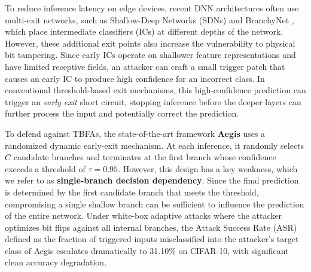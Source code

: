 \documentclass[conference,10pt]{IEEEtran}
\begin{document}

To reduce inference latency on edge devices, recent DNN architectures often use multi-exit networks, such as Shallow-Deep Networks (SDNs) \cite{kaya2019sdn} and BranchyNet \cite{teerapittayanon2016branchynet}, which place intermediate classifiers (ICs) at different depths of the network. However, these additional exit points also increase the vulnerability to physical bit tampering. Since early ICs operate on shallower feature representations and have limited receptive fields, an attacker can craft a small trigger patch that causes an early IC to produce high confidence for an incorrect class. In conventional threshold-based exit mechanisms, this high-confidence prediction can trigger an \textit{early exit} short circuit, stopping inference before the deeper layers can further process the input and potentially correct the prediction.



To defend against TBFAs, the state-of-the-art framework \textbf{Aegis} \cite{wang2023aegis} uses a randomized dynamic early-exit mechanism. At each inference, it randomly selects $C$ candidate branches and terminates at the first branch whose confidence exceeds a threshold of $\tau = 0.95$. However, this design has a key weakness, which we refer to as \textbf{single-branch decision dependency}. Since the final prediction is determined by the first candidate branch that meets the threshold, compromising a single shallow branch can be sufficient to influence the prediction of the entire network. Under white-box adaptive attacks where the attacker optimizes bit flips against all internal branches, the Attack Success Rate (ASR) defined as the fraction of triggered inputs misclassified into the attacker's target class of Aegis escalates dramatically to 31.10\% on CIFAR-10, with significant clean accuracy degradation.
\end{document}
